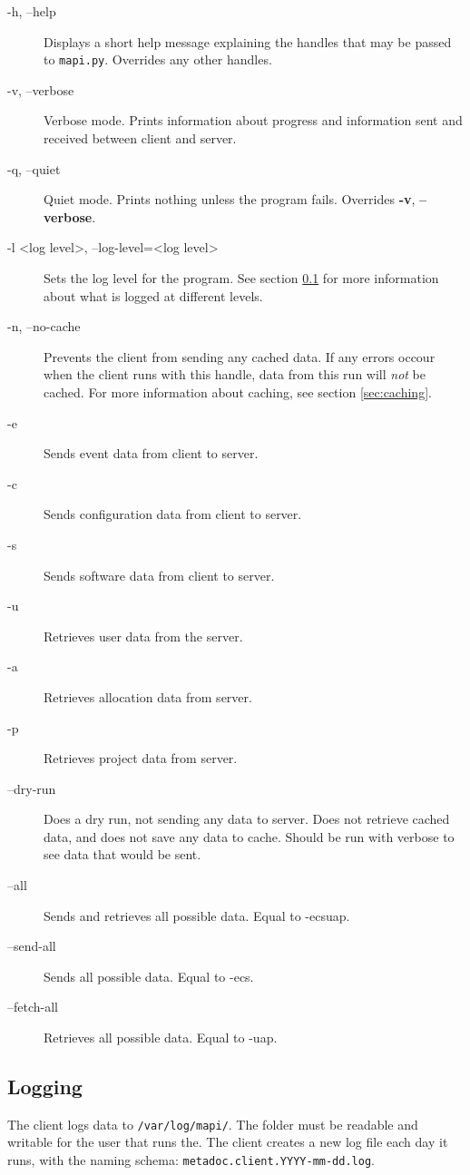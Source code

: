 \begin{description}
    \item[-h, --help]   Displays a short help message explaining the handles
    that may be passed to \texttt{mapi.py}. Overrides any other handles.
    \item[-v, --verbose]    Verbose mode. Prints information about progress and
    information sent and received between client and server. 
    \item[-q, --quiet]  Quiet mode. Prints nothing unless the program fails.
    Overrides \textbf{-v}, \textbf{--verbose}.
    \item[-l \textless log level\textgreater, --log-level=\textless log
    level\textgreater] Sets the log level for the program. See section 
    \ref{sec:logging} for more information about what is logged at different 
    levels.
    \item[-n, --no-cache]   Prevents the client from sending any cached data.
    If any errors occour when the client runs with this handle, data from this
    run will \textit{not} be cached. For more information about caching, see
    section \ref{sec:caching}.
    \item[-e]   Sends event data from client to server.
    \item[-c]   Sends configuration data from client to server.
    \item[-s]   Sends software data from client to server.
    \item[-u]   Retrieves user data from the server.
    \item[-a]   Retrieves allocation data from server.
    \item[-p]   Retrieves project data from server.
    \item[--dry-run]    Does a dry run, not sending any data to server. Does
        not retrieve cached data, and does not save any data to cache.
        Should be run with verbose to see data that would be sent.
    \item[--all]    Sends and retrieves all possible data. Equal to -ecsuap.
    \item[--send-all]   Sends all possible data. Equal to -ecs.
    \item[--fetch-all]  Retrieves all possible data. Equal to -uap.
\end{description}

\subsection{Logging}
\label{sec:logging}
The client logs data to \texttt{/var/log/mapi/}. The folder must be readable
and writable for the user that runs the.  The client creates a new log file
each day it runs, with the naming schema:
\texttt{metadoc.client.YYYY-mm-dd.log}. 

